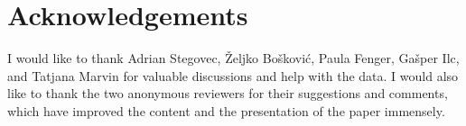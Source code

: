 \documentclass[output=paper,nonflat,newtxmath]{langsci/langscibook}
\begin{document}
\section*{Acknowledgements}
I would like to thank Adrian Stegovec, Željko Bošković, Paula Fenger, Gašper Ilc, and Tatjana Marvin for valuable discussions and help with the data. I would also like to thank the two anonymous reviewers for their suggestions and comments, which have improved the content and the presentation of the paper immensely.

\sloppy
\printbibliography[heading=subbibliography,notkeyword=this]
\end{document}
